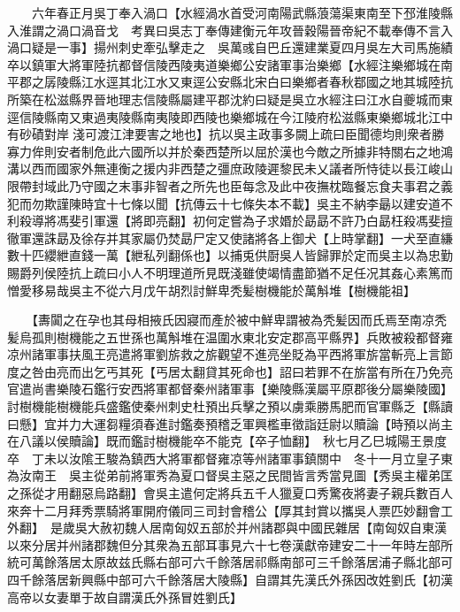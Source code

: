 　　六年春正月吳丁奉入渦口【水經渦水首受河南陽武縣蒗蕩渠東南至下邳淮陵縣入淮謂之渦口渦音戈　考異曰吳志丁奉傳建衡元年攻晉穀陽晉帝紀不載奉傳不言入渦口疑是一事】揚州刺史牽弘擊走之　吳萬彧自巴丘還建業夏四月吳左大司馬施績卒以鎮軍大將軍陸抗都督信陵西陵夷道樂鄉公安諸軍事治樂鄉【水經注樂鄉城在南平郡之孱陵縣江水逕其北江水又東逕公安縣北宋白曰樂鄉者春秋鄀國之地其城陸抗所築在松滋縣界晉地理志信陵縣屬建平郡沈約曰疑是吳立水經注曰江水自夔城而東逕信陵縣南又東過夷陵縣南夷陵即西陵也樂鄉城在今江陵府松滋縣東樂鄉城北江中有砂磧對岸淺可渡江津要害之地也】抗以吳主政事多闕上疏曰臣聞德均則衆者勝寡力侔則安者制危此六國所以并於秦西楚所以屈於漢也今敵之所據非特關右之地鴻溝以西而國家外無連衡之援内非西楚之彊庶政陵遲黎民未乂議者所恃徒以長江峻山限帶封域此乃守國之末事非智者之所先也臣每念及此中夜撫枕臨餐忘食夫事君之義犯而勿欺謹陳時宜十七條以聞【抗傳云十七條失本不載】吳主不納李朂以建安道不利殺導將馮斐引軍還【將即亮翻】初何定嘗為子求㛰於勗勗不許乃白勗枉殺馮斐擅徹軍還誅勗及徐存并其家屬仍焚勗尸定又使諸將各上御犬【上時掌翻】一犬至直縑數十匹纓紲直錢一萬【紲私列翻係也】以捕兎供㕑吳人皆歸罪於定而吳主以為忠勤賜爵列侯陸抗上疏曰小人不明理道所見既淺雖使竭情盡節猶不足任况其姦心素篤而憎愛移易哉吳主不從六月戊午胡烈討鮮卑秃髪樹機能於萬斛堆【樹機能祖】

　　【夀闐之在孕也其母相掖氏因寢而產於被中鮮卑謂被為秃髪因而氏焉至南凉秃髪烏孤則樹機能之五世孫也萬斛堆在温圍水東北安定郡高平縣界】兵敗被殺都督雍凉州諸軍事扶風王亮遣將軍劉旂救之旂觀望不進亮坐貶為平西將軍旂當斬亮上言節度之咎由亮而出乞丐其死【丐居太翻貸其死命也】詔曰若罪不在旂當有所在乃免亮官遣尚書樂陵石鑑行安西將軍都督秦州諸軍事【樂陵縣漢屬平原郡後分屬樂陵國】討樹機能樹機能兵盛鑑使秦州刺史杜預出兵擊之預以虜乘勝馬肥而官軍縣乏【縣讀曰懸】宜并力大運芻糧須春進討鑑奏預稽乏軍興檻車徵詣廷尉以贖論【時預以尚主在八議以侯贖論】既而鑑討樹機能卒不能克【卒子恤翻】　秋七月乙巳城陽王景度卒　丁未以汝隂王駿為鎮西大將軍都督雍凉等州諸軍事鎮關中　冬十一月立皇子東為汝南王　吳主從弟前將軍秀為夏口督吳主惡之民間皆言秀當見圖【秀吳主權弟匡之孫從才用翻惡烏路翻】會吳主遣何定將兵五千人獵夏口秀驚夜將妻子親兵數百人來奔十二月拜秀票騎將軍開府儀同三司封會稽公【厚其封賞以攜吳人票匹妙翻會工外翻】　是歲吳大赦初魏人居南匈奴五部於并州諸郡與中國民雜居【南匈奴自東漢以來分居并州諸郡魏但分其衆為五部耳事見六十七卷漢獻帝建安二十一年時左部所統可萬餘落居太原故兹氏縣右部可六千餘落居祁縣南部可三千餘落居浦子縣北部可四千餘落居新興縣中部可六千餘落居大陵縣】自謂其先漢氏外孫因改姓劉氏【初漢高帝以女妻單于故自謂漢氏外孫冒姓劉氏】

